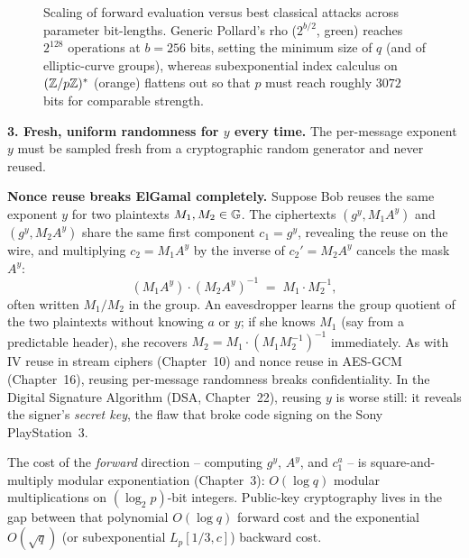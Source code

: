 \begin{figure}[htbp]
\caption{Scaling of forward evaluation versus best classical attacks across parameter bit-lengths. Generic Pollard's rho ($2^{b/2}$, green) reaches $2^{128}$ operations at $b = 256$ bits, setting the minimum size of $q$ (and of elliptic-curve groups), whereas subexponential index calculus on $(\mathbb{Z}/p\mathbb{Z})^{*}$ (orange) flattens out so that $p$ must reach roughly $3072$ bits for comparable strength.}
\label{ch20:fig-attack-scaling}
\end{figure}

\textbf{3. Fresh, uniform randomness for $y$ every time.} The per-message exponent $y$ must be
sampled fresh from a cryptographic random generator and never reused.

\begin{attackbox}
\textbf{Nonce reuse breaks ElGamal completely.} Suppose Bob reuses the same exponent $y$ for two plaintexts
$M_1, M_2 \in \mathbb{G}$. The ciphertexts $(g^y, M_1 A^y)$ and $(g^y, M_2 A^y)$ share the same first component $c_1 = g^y$, revealing the reuse on the wire, and multiplying $c_2 = M_1 A^y$ by the inverse of $c_2' = M_2 A^y$ cancels the mask $A^y$:
\[
  (M_1 A^y) \cdot (M_2 A^y)^{-1} \;=\; M_1 \cdot M_2^{-1},
\]
often written $M_1 / M_2$ in the group. An eavesdropper learns the group quotient of the two plaintexts without knowing $a$ or $y$; if she knows $M_1$ (say from a predictable header), she recovers $M_2 = M_1 \cdot (M_1 M_2^{-1})^{-1}$ immediately. As with IV reuse in stream ciphers (Chapter~10) and nonce reuse in AES-GCM (Chapter~16), reusing per-message randomness breaks confidentiality. In the Digital Signature Algorithm (DSA, Chapter~22), reusing $y$ is worse still: it reveals the signer's \emph{secret key}, the flaw that broke code signing on the Sony PlayStation~3.
\end{attackbox}

\begin{connectionbox}
The cost of the \emph{forward} direction -- computing $g^y$, $A^y$, and $c_1^a$ -- is square-and-multiply
modular exponentiation (Chapter~3): $O(\log q)$ modular multiplications on $(\log_2 p)$-bit integers. Public-key cryptography lives in the gap between that polynomial $O(\log q)$ forward cost and the exponential $O(\sqrt{q})$ (or subexponential $L_p[1/3, c]$) backward cost.
\end{connectionbox}

